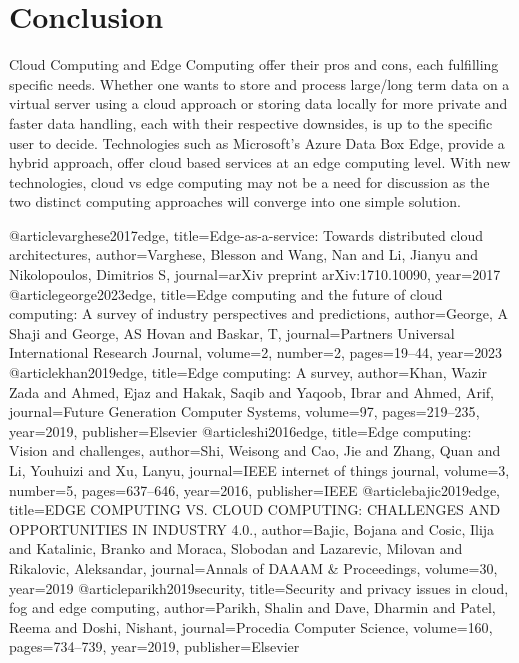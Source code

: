 \documentclass[conference]{IEEEtran}
\begin{document}
\section{Conclusion}
Cloud Computing and Edge Computing offer their pros and cons, each fulfilling specific needs. Whether one wants to store and process large/long term data on a virtual server using a cloud approach or storing data locally for more private and faster data handling, each with their respective downsides, is up to  the specific user to decide. Technologies such as Microsoft's Azure Data Box Edge, provide a hybrid approach, offer cloud based services at an edge computing level. With new technologies, cloud vs edge computing may not be a need for discussion as the two distinct computing approaches will converge into one simple solution. 




\begin{thebibliography}{00}
@article{varghese2017edge,
	title={Edge-as-a-service: Towards distributed cloud architectures},
	author={Varghese, Blesson and Wang, Nan and Li, Jianyu and Nikolopoulos, Dimitrios S},
	journal={arXiv preprint arXiv:1710.10090},
	year={2017}
}
@article{george2023edge,
	title={Edge computing and the future of cloud computing: A survey of industry perspectives and predictions},
	author={George, A Shaji and George, AS Hovan and Baskar, T},
	journal={Partners Universal International Research Journal},
	volume={2},
	number={2},
	pages={19--44},
	year={2023}
}
@article{khan2019edge,
	title={Edge computing: A survey},
	author={Khan, Wazir Zada and Ahmed, Ejaz and Hakak, Saqib and Yaqoob, Ibrar and Ahmed, Arif},
	journal={Future Generation Computer Systems},
	volume={97},
	pages={219--235},
	year={2019},
	publisher={Elsevier}
}
@article{shi2016edge,
	title={Edge computing: Vision and challenges},
	author={Shi, Weisong and Cao, Jie and Zhang, Quan and Li, Youhuizi and Xu, Lanyu},
	journal={IEEE internet of things journal},
	volume={3},
	number={5},
	pages={637--646},
	year={2016},
	publisher={IEEE}
}
@article{bajic2019edge,
	title={EDGE COMPUTING VS. CLOUD COMPUTING: CHALLENGES AND OPPORTUNITIES IN INDUSTRY 4.0.},
	author={Bajic, Bojana and Cosic, Ilija and Katalinic, Branko and Moraca, Slobodan and Lazarevic, Milovan and Rikalovic, Aleksandar},
	journal={Annals of DAAAM \& Proceedings},
	volume={30},
	year={2019}
}
@article{parikh2019security,
	title={Security and privacy issues in cloud, fog and edge computing},
	author={Parikh, Shalin and Dave, Dharmin and Patel, Reema and Doshi, Nishant},
	journal={Procedia Computer Science},
	volume={160},
	pages={734--739},
	year={2019},
	publisher={Elsevier}
}
\end{thebibliography}
\end{document}
